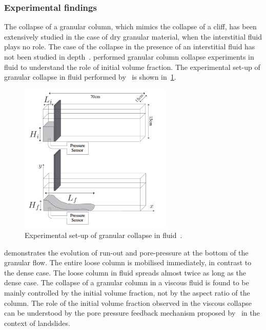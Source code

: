 \subsubsection{Experimental findings}

The collapse of a granular column, which mimics the collapse of a cliff, has 
been extensively studied in the case of dry granular material, when the 
interstitial fluid plays no role. The case of the collapse in the presence of 
an interstitial fluid has not been studied in depth~\citep{Topin2012}. 
\citet{Rondon2011} performed granular column collapse experiments in fluid to 
understand the role of initial volume fraction. The experimental set-up 
of granular collapse in fluid performed by~\citet{Rondon2011} is shown 
in~\cref{fig:Fluid_Collapse}.

\begin{figure}[htbp]
\centering
\includegraphics[width=0.65\textwidth]{Fluid_Collapse}
\caption{Experimental set-up of granular collapse in fluid~\citep{Rondon2011}.}
\label{fig:Fluid_Collapse}
\end{figure}

 demonstrates the evolution of run-out 
and pore-pressure at the bottom of the granular flow. The entire loose column 
is 
mobilised immediately, in contrast to the dense case. The loose column in fluid 
spreads almost twice as long as the dense case. The collapse of a granular 
column in a viscous fluid is found to be mainly controlled by the initial 
volume fraction, not by the aspect ratio of the column. The role of the initial 
volume fraction observed in the viscous collapse can be understood by the pore 
pressure feedback mechanism proposed by~\citet{Schaeffer2008,Iverson2000} in 
the context of landslides. 

